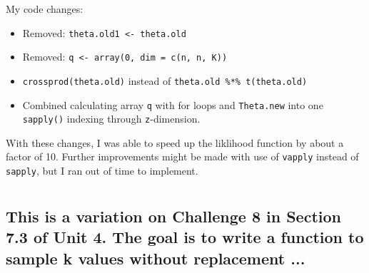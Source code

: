 \documentclass{article}\usepackage[]{graphicx}\usepackage[]{color}
\begin{document}
My code changes:

\begin{itemize}
    \item Removed: \texttt{theta.old1 <- theta.old}
    \item Removed: \texttt{q <- array(0, dim = c(n, n, K))}
    \item \texttt{crossprod(theta.old)} instead of \texttt{theta.old \%*\% t(theta.old)}
    \item Combined calculating array \texttt{q} with for loops and \texttt{Theta.new} into one \texttt{sapply()} indexing through \texttt{z}-dimension.
\end{itemize}

With these changes, I was able to speed up the liklihood function by about a factor of 10. Further improvements might be made with use of \texttt{vapply} instead of \texttt{sapply}, but I ran out of time to implement.

\section{} %
\subsection{This is a variation on Challenge 8 in Section 7.3 of Unit 4. The goal is to write a function to sample k values without replacement ...}  %
\end{document}
